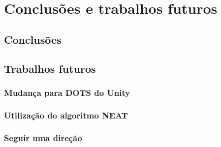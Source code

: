 \chapter{Conclusões e trabalhos futuros}
\label{ch6}

\section{Conclusões}

\section{Trabalhos futuros}
\subsection{Mudança para DOTS do Unity}
\subsection{Utilização do algoritmo NEAT}
\subsection{Seguir uma direção}